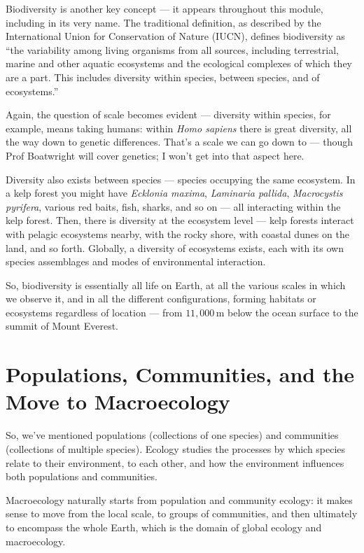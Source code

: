 \documentclass[
  12pt,
]{book}
\begin{document}
Biodiversity is another key concept --- it appears throughout this
module, including in its very name. The traditional definition, as
described by the International Union for Conservation of Nature (IUCN),
defines biodiversity as ``the variability among living organisms from
all sources, including terrestrial, marine and other aquatic ecosystems
and the ecological complexes of which they are a part. This includes
diversity within species, between species, and of ecosystems.''

Again, the question of scale becomes evident --- diversity within
species, for example, means taking humans: within \emph{Homo sapiens}
there is great diversity, all the way down to genetic differences.
That's a scale we can go down to --- though Prof Boatwright will cover
genetics; I won't get into that aspect here.

Diversity also exists between species --- species occupying the same
ecosystem. In a kelp forest you might have \emph{Ecklonia maxima},
\emph{Laminaria pallida}, \emph{Macrocystis pyrifera}, various red
baits, fish, sharks, and so on --- all interacting within the kelp
forest. Then, there is diversity at the ecosystem level --- kelp forests
interact with pelagic ecosystems nearby, with the rocky shore, with
coastal dunes on the land, and so forth. Globally, a diversity of
ecosystems exists, each with its own species assemblages and modes of
environmental interaction.

So, biodiversity is essentially all life on Earth, at all the various
scales in which we observe it, and in all the different configurations,
forming habitats or ecosystems regardless of location --- from
\(11,000\,\mathrm{m}\) below the ocean surface to the summit of Mount
Everest.

\section{Populations, Communities, and the Move to
Macroecology}\label{populations-communities-and-the-move-to-macroecology}

So, we've mentioned populations (collections of one species) and
communities (collections of multiple species). Ecology studies the
processes by which species relate to their environment, to each other,
and how the environment influences both populations and communities.

Macroecology naturally starts from population and community ecology: it
makes sense to move from the local scale, to groups of communities, and
then ultimately to encompass the whole Earth, which is the domain of
global ecology and macroecology.
\end{document}

